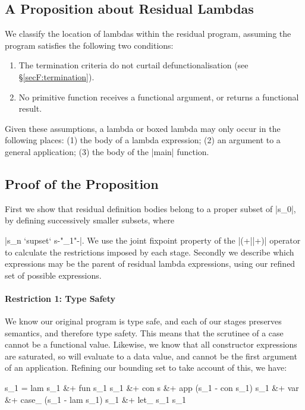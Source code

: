 \subsection{A Proposition about Residual Lambdas}


We classify the location of lambdas within the residual program, assuming the program satisfies the following two conditions:

\begin{enumerate}
\item The termination criteria do not curtail defunctionalisation (see \S\ref{secF:termination}).
\item No primitive function receives a functional argument, or returns a functional result.
\end{enumerate}

Given these assumptions, a lambda or boxed lambda may only occur in the following places: (1) the body of a lambda expression; (2) an argument to a general application; (3) the body of the |main| function.

\subsection{Proof of the Proposition}


First we show that residual definition bodies belong to a proper subset of |s_0|, by defining successively smaller subsets, where \ignore|s_n `supset` s{-"_{\text{\tiny{+}}1}"-}|. We use the joint fixpoint property of the |(+||+)| operator to calculate the restrictions imposed by each stage. Secondly we describe which expressions may be the parent of residual lambda expressions, using our refined set of possible expressions.

\paragraph{Restriction 1: Type Safety}
We know our original program is type safe, and each of our stages preserves semantics, and therefore type safety. This means that the scrutinee of a case cannot be a functional value. Likewise, we know that all constructor expressions are saturated, so will evaluate to a data value, and cannot be the first argument of an application. Refining our bounding set to take account of this, we have:

\ignore\begin{code}
s_1  =  lam s_1 &+ fun s_1 s_1 &+ con s &+ app (s_1 - con s_1) s_1 &+ var &+
        case_ (s_1 - lam s_1) s_1 &+ let_ s_1 s_1
\end{code}

